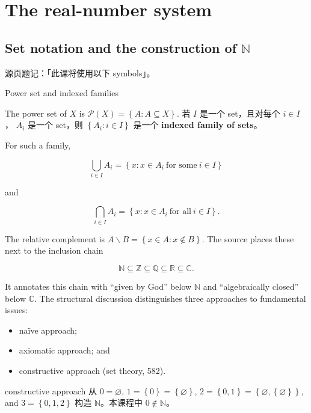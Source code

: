 \chapter{The real-number system}

\section{\texorpdfstring{Set notation and the construction of \(\mathbb{N}\)}{Set notation and the construction of \textbackslash mathbb\{N\}}}

源页题记：「此课将使用以下 symbols」。

\begin{definition}{Power set and indexed families}

The power set of \(X\) is \(\mathcal{P}(X) = \left\{ {A:A \subseteq X} \right\}\). 若 \(I\) 是一个 set，且对每个 \(i \in I\)， \(A_{i}\) 是一个 set，则 \(\left\{ {A_{i}:i \in I} \right\}\) 是一个 \textbf{indexed family of sets}。

\end{definition}

For such a family,

\[\bigcup\limits_{i \in I}A_{i} = \left\{ {x:x \in A_{i}\ \text{for some}\ i \in I} \right\}\]

and

\[\bigcap\limits_{i \in I}A_{i} = \left\{ {x:x \in A_{i}\ \text{for all}\ i \in I} \right\}.\]

The relative complement is \(A \smallsetminus B = \left\{ {x \in A:x \notin B} \right\}\). The source places these next to the inclusion chain

\[\mathbb{N} \subseteq \mathbb{Z} \subseteq \mathbb{Q} \subseteq \mathbb{R} \subseteq \mathbb{C}.\]

It annotates this chain with ``given by God'' below \(\mathbb{N}\) and ``algebraically closed'' below \(\mathbb{C}\). The structural discussion distinguishes three approaches to fundamental issues:

\begin{itemize}
\tightlist
\item
  naïve approach;
\item
  axiomatic approach; and
\item
  constructive approach (set theory, 582).
\end{itemize}

constructive approach 从 \(0 = \varnothing\), \(1 = \left\{ 0 \right\} = \left\{ \varnothing \right\}\), \(2 = \left\{ {0,1} \right\} = \left\{ {\varnothing,\left\{ \varnothing \right\}} \right\}\), and \(3 = \left\{ {0,1,2} \right\}\) 构造 \(\mathbb{N}\)。本课程中 \(0 \notin \mathbb{N}\)。

